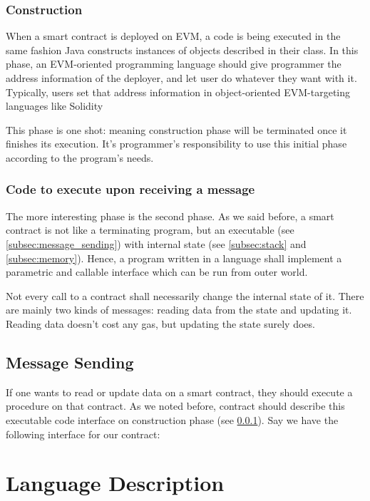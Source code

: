 \documentclass{article}
\begin{document}
\subsubsection{Construction}
\label{subsubsec:construction}
\par When a smart contract is deployed on EVM, a code is being executed in the same fashion Java\cite{java} constructs instances of objects described in their class. In this phase, an EVM-oriented programming language should give programmer the address information of the deployer, and let user do whatever they want with it. Typically, users set that address information in object-oriented EVM-targeting languages like Solidity\cite{solidity}
\par This phase is one shot: meaning construction phase will be terminated once it finishes its execution. It's programmer's responsibility to use this initial phase according to the program's needs.
\subsubsection{Code to execute upon receiving a message}
\par The more interesting phase is the second phase. As we said before, a smart contract is not like a terminating program, but an executable (see \ref{subsec:message_sending}) with internal state (see \ref{subsec:stack} and \ref{subsec:memory}). Hence, a program written in a language shall implement a parametric and callable interface which can be run from outer world.
\par Not every call to a contract shall necessarily change the internal state of it. There are mainly two kinds of messages: reading data from the state and updating it. Reading data doesn't cost any gas, but updating the state surely does.
\newpage
\subsection{Message Sending}
If one wants to read or update data on a smart contract, they should execute a procedure on that contract. As we noted before, contract should describe this executable code interface on construction phase (see \ref{subsubsec:construction}). Say we have the following interface for our contract:

\label{subsec:message_sending}
\section{Language Description}
\label{sec:language_description}
\end{document}
